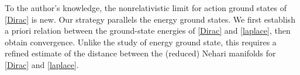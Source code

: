 \documentclass{amsart}
\theoremstyle{plain}
\theoremstyle{definition}
\theoremstyle{remark}
\numberwithin{equation}{section} \numberwithin{figure}{section}
\begin{document}
To the author's knowledge, the nonrelativistic limit for action ground states of \eqref{Dirac} is new. Our strategy parallels the energy ground states. We first establish a priori relation between the ground-state energies of \eqref{Dirac} and \eqref{laplace}, then obtain convergence. Unlike the study of energy ground state, this requires a refined estimate of the distance between the (reduced) Nehari manifolds for \eqref{Dirac} and \eqref{laplace}.


   


 \medskip
\end{document}
